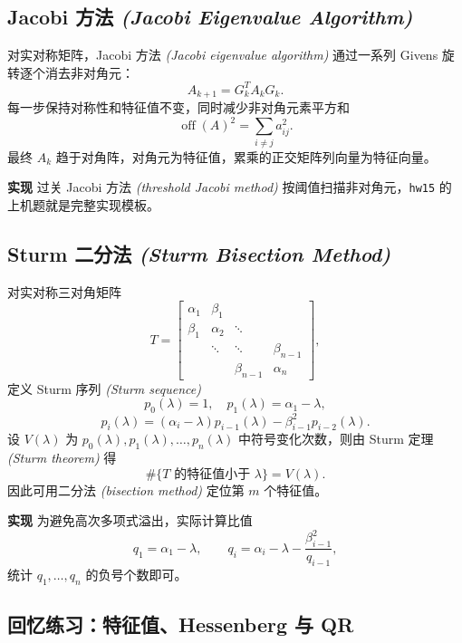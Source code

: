 \documentclass{article}
\newcommand{\off}{\operatorname{off}}
\newcommand{\impl}{\textcolor{blue!65!black}{\textbf{实现}}}
\newcommand{\eng}[1]{\texorpdfstring{{\normalfont\rmfamily\itshape\textcolor{blue!65!black}{(#1)}}}{(#1)}}
\begin{document}
\subsection{Jacobi 方法 \eng{Jacobi Eigenvalue Algorithm}}

对实对称矩阵，Jacobi 方法 \eng{Jacobi eigenvalue algorithm} 通过一系列 Givens 旋转逐个消去非对角元：
\[
  A_{k+1}=G_k^TA_kG_k.
\]
每一步保持对称性和特征值不变，同时减少非对角元素平方和
\[
  \off(A)^2=\sum_{i\ne j}a_{ij}^2.
\]
最终 $A_k$ 趋于对角阵，对角元为特征值，累乘的正交矩阵列向量为特征向量。

\impl{} 过关 Jacobi 方法 \eng{threshold Jacobi method} 按阈值扫描非对角元，\texttt{hw15} 的上机题就是完整实现模板。

\subsection{Sturm 二分法 \eng{Sturm Bisection Method}}

对实对称三对角矩阵
\[
  T=
  \begin{bmatrix}
    \alpha_1&\beta_1\\
    \beta_1&\alpha_2&\ddots\\
    &\ddots&\ddots&\beta_{n-1}\\
    &&\beta_{n-1}&\alpha_n
  \end{bmatrix},
\]
定义 Sturm 序列 \eng{Sturm sequence}
\[
  p_0(\lambda)=1,\quad p_1(\lambda)=\alpha_1-\lambda,
\]
\[
  p_i(\lambda)=(\alpha_i-\lambda)p_{i-1}(\lambda)-\beta_{i-1}^2p_{i-2}(\lambda).
\]
设 $V(\lambda)$ 为 $p_0(\lambda),p_1(\lambda),\dots,p_n(\lambda)$ 中符号变化次数，则由 Sturm 定理
\eng{Sturm theorem} 得
\[
  \#\{\text{$T$ 的特征值小于 }\lambda\}=V(\lambda).
\]
因此可用二分法 \eng{bisection method} 定位第 $m$ 个特征值。

\impl{} 为避免高次多项式溢出，实际计算比值
\[
  q_1=\alpha_1-\lambda,\qquad
  q_i=\alpha_i-\lambda-\frac{\beta_{i-1}^2}{q_{i-1}},
\]
统计 $q_1,\dots,q_n$ 的负号个数即可。

\subsection{回忆练习：特征值、Hessenberg 与 QR}
\end{document}
